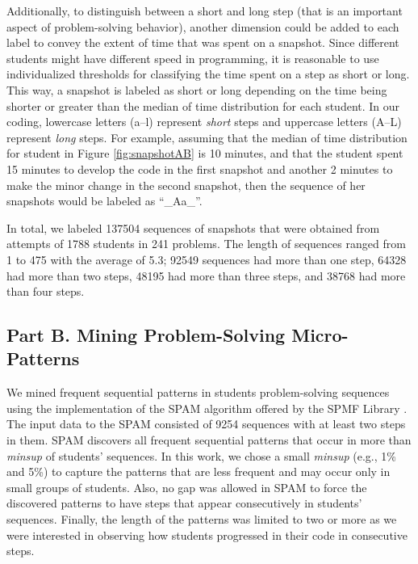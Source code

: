 \documentclass{sigchi}
\begin{document}
Additionally, to distinguish between a short and long step (that is an important aspect of problem-solving behavior), another dimension could be added to each label to convey the extent of time that was spent on a snapshot. Since different students might have different speed in programming, it is reasonable to use individualized thresholds for classifying the time spent on a step as short or long. This way, a snapshot is labeled as short or long depending on the time being shorter or greater than the median of time distribution for each student. In our coding, lowercase letters (a--l) represent \textit{short} steps and uppercase letters (A--L) represent \textit{long} steps. For example, assuming that the median of time distribution for student in Figure \ref{fig:snapshotAB} is 10 minutes, and that the student spent 15 minutes to develop the code in the first snapshot and another 2 minutes to make the minor change in the second snapshot, then the sequence of her snapshots would be labeled as ``{\_}Aa{\_}''.

In total, we labeled \num{137504} sequences of snapshots that were obtained from attempts of 1788 students in 241 problems. The length of sequences ranged from 1 to 475 with the average of 5.3; \num{92549} sequences had more than one step, \num{64328} had more than two steps, \num{48195} had more than three steps, and \num{38768} had more than four steps.

\subsection{Part B. Mining Problem-Solving Micro-Patterns}
We mined frequent sequential patterns in students problem-solving sequences using the implementation of the SPAM algorithm \cite{ayres2002sequential} offered by the SPMF Library \cite{fournier2016spmf}. The input data to the SPAM consisted of 9254 sequences with at least two steps in them. SPAM discovers all frequent sequential patterns that occur in more than \textit{minsup} of students' sequences. In this work, we chose a small \textit{minsup} (e.g.,  1\% and 5\%) to capture the patterns that are less frequent and may occur only in small groups of students. Also, no gap was allowed in SPAM to force the discovered patterns to have steps that appear consecutively in students' sequences. Finally, the length of the patterns was limited to two or more as we were interested in observing how students progressed in their code in consecutive steps. 
\end{document}
